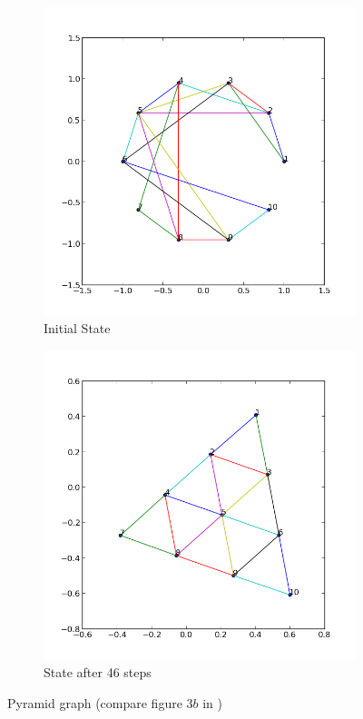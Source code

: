 \documentclass[12pt,a4paper]{article}
\begin{document}
\begin{figure}[htb]
	 \begin{subfigure}{0.5\textwidth}
		   \centering
           \includegraphics[scale=0.45]{results_Kawai/ex_triang_before}
           \caption{Initial State}
     \end{subfigure}
	 \begin{subfigure}{0.5\textwidth}
			\centering
           \includegraphics[scale=0.45]{results_Kawai/ex_triang_after}
            \caption{State after 46 steps}
     \end{subfigure}
     \caption{Pyramid graph (compare figure $3 b$ in \cite{TomihisaKamada1989})}
     \label{fig: triangGraph}
\end{figure}    
\end{document}
